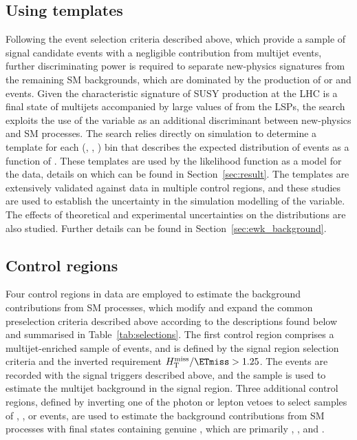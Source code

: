 \subsection{Using \texorpdfstring{\HTmiss}{HTmiss} templates}
\label{sec:mht_templates} 

Following the event selection criteria described above, which provide
a sample of signal candidate events with a negligible contribution
from multijet events, further discriminating power is required to
separate new-physics signatures from the remaining SM backgrounds,
which are dominated by the production of \ttbar or \wlj and \znunuj
events. Given the characteristic signature of SUSY production at the
LHC is a final state of multijets accompanied by large values of
\ptvecmiss from the LSPs, the search exploits the use of the \HTmiss
variable as an additional discriminant between new-physics and SM
processes. The search relies directly on simulation to determine a
template for each (\njet, \nb, \scalht) bin that describes the
expected distribution of events as a function of \HTmiss. These
templates are used by the likelihood function as a model for the data,
details on which can be found in Section~\ref{sec:result}. The
templates are extensively validated against data in multiple control
regions, and these studies are used to establish the uncertainty in
the simulation modelling of the \HTmiss variable. The effects of
theoretical and experimental uncertainties on the \HTmiss
distributions are also studied. Further details can be found in
Section~\ref{sec:ewk_background}.


\subsection{Control regions}
\label{sec:control_regions}

Four control regions in data are employed to estimate the background
contributions from SM processes, which modify and expand the common
preselection criteria described above according to the descriptions
found below and summarised in Table~\ref{tab:selections}. The first
control region comprises a multijet-enriched sample of events, and is
defined by the signal region selection criteria and the inverted
requirement $\HTmiss / \ETmiss > 1.25$. The events are recorded with
the signal triggers described above, and the sample is used to
estimate the multijet background in the signal region. Three
additional control regions, defined by inverting one of the photon or
lepton vetoes to select samples of \gj, \mj, or \mmj events, are used
to estimate the background contributions from SM processes with final
states containing genuine \ptvecmiss, which are primarily \ttbar,
\wlj, and \znunuj.


